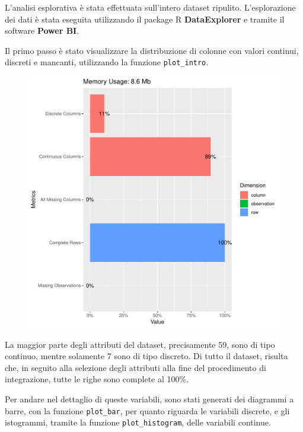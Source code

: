 L'analisi esplorativa è stata effettuata sull'intero dataset ripulito. 
L'esplorazione dei dati è stata eseguita utilizzando il package R 
\textbf{DataExplorer} e tramite il software \textbf{Power BI}.

Il primo passo è stato visualizzare la distribuzione di colonne con valori 
continui, discreti e mancanti, utilizzando la funzione \texttt{plot\_intro}.

\begin{figure}[htb]
	\centering
	\includegraphics[width=0.5\columnwidth]{images/ml/plot_intro}
	\caption{}
	\label{fig:plot_intro}
\end{figure}

La maggior parte degli attributi del dataset, precisamente 59, sono di tipo 
continuo, mentre solamente 7 sono di tipo discreto. Di tutto il dataset, 
risulta che, in seguito alla selezione degli attributi alla fine del 
procedimento di integrazione, tutte le righe sono complete al 100\%. 

Per andare nel dettaglio di queste variabili, sono stati generati dei diagrammi 
a barre, con la funzione \texttt{plot\_bar}, per quanto riguarda le variabili 
discrete, e gli istogrammi, tramite la funzione \texttt{plot\_histogram}, delle 
variabili continue.

